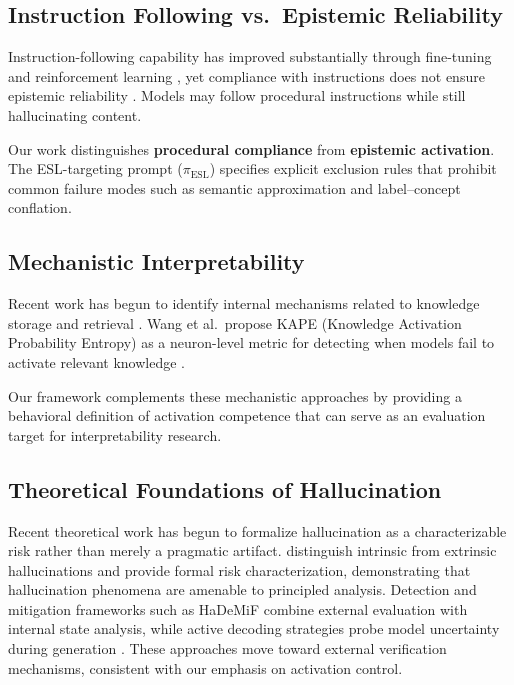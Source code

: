 \documentclass[11pt,a4paper]{article}
\begin{document}
\subsection{Instruction Following vs.\ Epistemic Reliability}

Instruction-following capability has improved substantially through fine-tuning and reinforcement learning \citep{ouyang2022training}, yet compliance with instructions does not ensure epistemic reliability \citep{ji2023survey}. Models may follow procedural instructions while still hallucinating content.

Our work distinguishes \textbf{procedural compliance} from \textbf{epistemic activation}. The ESL-targeting prompt ($\pi_{\text{ESL}}$) specifies explicit exclusion rules that prohibit common failure modes such as semantic approximation and label--concept conflation.

\subsection{Mechanistic Interpretability}

Recent work has begun to identify internal mechanisms related to knowledge storage and retrieval \citep{meng2022locating, geva2023dissecting, burns2022discovering}. Wang et al.\ propose KAPE (Knowledge Activation Probability Entropy) as a neuron-level metric for detecting when models fail to activate relevant knowledge \citep{wang2025kape}.

Our framework complements these mechanistic approaches by providing a behavioral definition of activation competence that can serve as an evaluation target for interpretability research.

\subsection{Theoretical Foundations of Hallucination}

Recent theoretical work has begun to formalize hallucination as a characterizable risk rather than merely a pragmatic artifact. \citet{gumaan2025theoretical} distinguish intrinsic from extrinsic hallucinations and provide formal risk characterization, demonstrating that hallucination phenomena are amenable to principled analysis. Detection and mitigation frameworks such as HaDeMiF \citep{hademif2024} combine external evaluation with internal state analysis, while active decoding strategies probe model uncertainty during generation \citep{diversiondecoding2024}. These approaches move toward external verification mechanisms, consistent with our emphasis on activation control.
\end{document}
